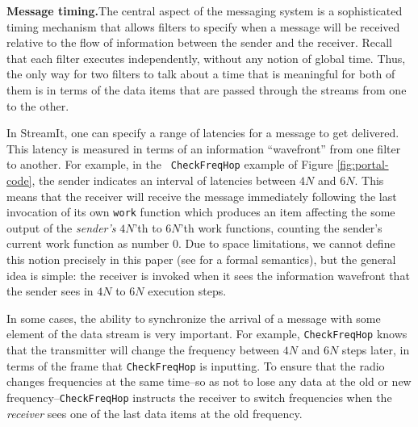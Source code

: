 {\bf Message timing.}The central aspect of the messaging system is a
sophisticated timing mechanism that allows filters to specify when a
message will be received relative to the flow of information between
the sender and the receiver.  Recall that each filter executes
independently, without any notion of global time.  Thus, the only way
for two filters to talk about a time that is meaningful for both of
them is in terms of the data items that are passed through the streams
from one to the other.

In StreamIt, one can specify a range of latencies for a message to get
delivered.  This latency is measured in terms of an information
``wavefront'' from one filter to another.  For example, in the {\tt
CheckFreqHop} example of Figure \ref{fig:portal-code}, the sender
indicates an interval of latencies between $4N$ and $6N$.  This means
that the receiver will receive the message immediately following the
last invocation of its own {\tt work} function which produces an item
affecting the some output of the {\it sender's} $4N$'th to $6N$'th
work functions, counting the sender's current work function as number
0.  Due to space limitations, we cannot define this notion precisely
in this paper (see \cite{streamittech620,streamittech622} for a formal
semantics), but the general idea is simple: the receiver is invoked
when it sees the information wavefront that the sender sees in $4N$ to
$6N$ execution steps.

In some cases, the ability to synchronize the arrival of a message
with some element of the data stream is very important.  For example,
{\tt CheckFreqHop} knows that the transmitter will change the
frequency between $4N$ and $6N$ steps later, in terms of the frame
that {\tt CheckFreqHop} is inputting.  To ensure that the radio
changes frequencies at the same time--so as not to lose any data at
the old or new frequency--{\tt CheckFreqHop} instructs the receiver to
switch frequencies when the {\it receiver} sees one of the last data
items at the old frequency.

